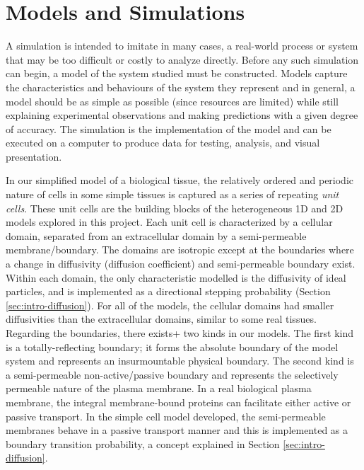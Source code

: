 \chapter{Models and Simulations}
\label{chapter:mods-sims}
	
	A simulation is intended to imitate in many cases, a real-world process or system that may be too difficult or costly to analyze directly. Before any such simulation can begin, a model of the system studied must be constructed. Models capture the characteristics and behaviours of the system they represent and in general, a model should be as simple as possible (since resources are limited) while still explaining experimental observations and making predictions with a given degree of accuracy. The simulation is the implementation of the model and can be executed on a computer to produce data for testing, analysis, and visual presentation.

	In our simplified model of a biological tissue, the relatively ordered and periodic nature of cells in some simple tissues is captured as a series of repeating \textsl{unit cells}. These unit cells are the building blocks of the heterogeneous 1D and 2D models explored in this project. Each unit cell is characterized by a cellular domain, separated from an extracellular domain by a semi-permeable membrane/boundary. The domains are isotropic except at the boundaries where a change in diffusivity (diffusion coefficient) and semi-permeable boundary exist. Within each domain, the only characteristic modelled is the diffusivity of ideal particles, and is implemented as a directional stepping probability (Section \ref{sec:intro-diffusion}). For all of the models, the cellular domains had smaller diffusivities than the extracellular domains, similar to some real tissues. Regarding the boundaries, there exists+ two kinds in our models. The first kind is a totally-reflecting boundary; it forms the absolute boundary of the model system and represents an insurmountable physical boundary. The second kind is a semi-permeable non-active/passive boundary and represents the selectively permeable nature of the plasma membrane. In a real biological plasma membrane, the integral membrane-bound proteins can facilitate either active or passive transport. In the simple cell model developed, the semi-permeable membranes behave in a passive transport manner and this is implemented as a boundary transition probability, a concept explained in Section \ref{sec:intro-diffusion}.
	
